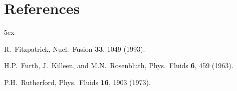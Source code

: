 \documentclass[12pt,prb,aps]{revtex4-1}
\begin{document}
\section*{References}
\begin{thebibliography}{99}\baselineskip 5ex



 R.~Fitzpatrick, Nucl.\ Fusion {\bf 33}, 1049 (1993).







 H.P.~Furth,  J.~Killeen, and M.N.~Rosenbluth,  Phys.\ Fluids {\bf 6}, 459 (1963).




 P.H.~Rutherford,  Phys.\ Fluids  {\bf 16}, 1903 (1973).




\end{thebibliography}

\end{document}
